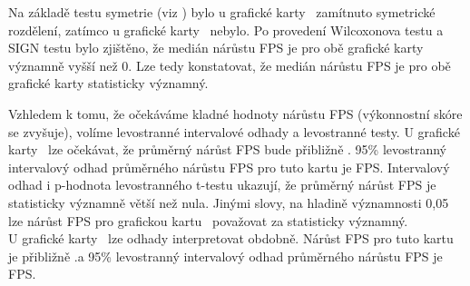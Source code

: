 \begin{enumerate}[label=\alph*)]
\begin{minipage}{0.94\textwidth}
        Na základě testu symetrie (viz ) bylo u grafické karty \nvidiaCard\ zamítnuto symetrické rozdělení,
        zatímco u grafické karty \amdCard\ nebylo.\@
        Po provedení Wilcoxonova testu a SIGN testu bylo zjištěno, že medián nárůstu FPS je pro obě grafické karty významně vyšší než 0.
        Lze tedy konstatovat, že medián nárůstu FPS je pro obě grafické karty statisticky významný.

        \label{tab:deterministic-normality-test}
        \vspace{0.5em}
        \renewcommand{\arraystretch}{1.3}
        \vspace{1em}

        Vzhledem k tomu, že očekáváme kladné hodnoty nárůstu FPS (výkonnostní skóre se zvyšuje), volíme levostranné intervalové odhady a levostranné testy.
        U grafické karty \nvidiaCard\ lze očekávat, že průměrný nárůst FPS bude přibližně .\@
        95\% levostranný intervalový odhad průměrného nárůstu FPS pro tuto kartu je \rtxInterval FPS.\@
        Intervalový odhad i p-hodnota levostranného t-testu ukazují, že průměrný nárůst FPS je statisticky významně větší než nula.
        Jinými slovy, na hladině významnosti 0,05 lze nárůst FPS pro grafickou kartu \nvidiaCard\ považovat za statisticky významný. \\

        U grafické karty \amdCard\ lze odhady interpretovat obdobně.
        Nárůst FPS pro tuto kartu je přibližně .\@ a 95\% levostranný intervalový odhad průměrného nárůstu FPS je \amdInterval FPS.\@


\end{minipage}
\end{enumerate}
